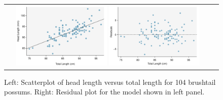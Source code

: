 \begin{figure}%
   \centering
  \begin{tabular}{cc}
   \includegraphics[width=0.45\textwidth]{ch_regr_simple_linear/figures/possumInference/possumScatter}
   \includegraphics[width=0.45\textwidth]{ch_regr_simple_linear/figures/possumInference/possumResidual}
\end{tabular}
   \caption{Left: Scatterplot of head length versus total length for 104 brushtail possums.   Right: Residual plot for the model shown in left panel.  }
\label{possumInferencePlots}
\end{figure}

